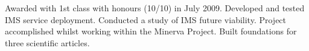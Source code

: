 Awarded with 1st class with honours (10/10) in July 2009. Developed and tested IMS service deployment. Conducted a study of IMS future viability. 
Project accomplished whilst working within the Minerva Project. Built foundations for three scientific articles.